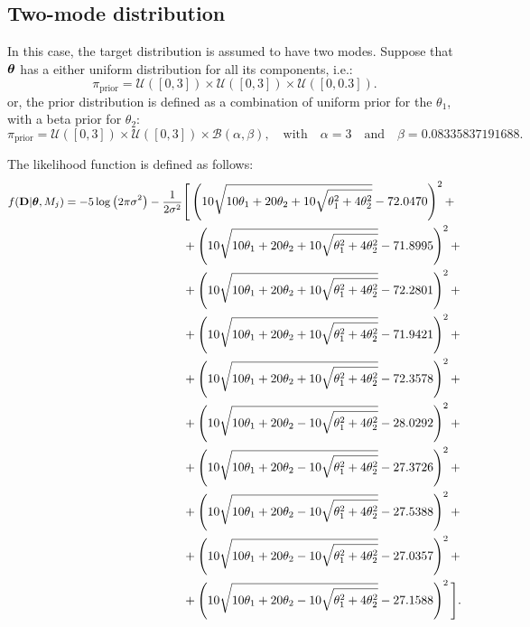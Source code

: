 \subsection{Two-mode distribution}

In this case, the target distribution is assumed to have two modes.
Suppose that $\mbox{\boldmath$ \theta $}$ has a either uniform distribution for all its components, i.e.:
$$
\pi_{\text{prior}}=\mathcal{U}([0,3]) \times \mathcal{U}([0,3]) \times \mathcal{U}([0,0.3]).
$$
or, the prior distribution is defined as a combination of uniform prior for the $\theta_1$, with a beta prior for $\theta_2$:
$$
\pi_{\text{prior}}=\mathcal{U}([0,3]) \times \mathcal{U}([0,3]) \times \mathcal{B}(\alpha,\beta), \quad \text{with} \quad \alpha=3 \quad\text{and}\quad \beta=0.08335837191688.
$$

The likelihood function is defined as follows:
\begin{equation}
\begin{split}\small
f({\bf D}|\mbox{\boldmath$ \theta $}, M_j)=  -5 \log\left(2 \pi \sigma^2\right)- \dfrac{1}{2\sigma^2} &\Bigg[ 
  \left(10 \sqrt{10 \theta_1+20 \theta_2+10 \sqrt{\theta_1^2+4 \theta_2^2}}-72.0470\right)^2+\\
&+\left(10 \sqrt{10 \theta_1+20 \theta_2+10 \sqrt{\theta_1^2+4 \theta_2^2}}-71.8995\right)^2+\\
&+\left(10 \sqrt{10 \theta_1+20 \theta_2+10 \sqrt{\theta_1^2+4 \theta_2^2}}-72.2801\right)^2+\\
&+\left(10 \sqrt{10 \theta_1+20 \theta_2+10 \sqrt{\theta_1^2+4 \theta_2^2}}-71.9421\right)^2+\\
&+\left(10 \sqrt{10 \theta_1+20 \theta_2+10 \sqrt{\theta_1^2+4 \theta_2^2}}-72.3578\right)^2+\\
&+\left(10 \sqrt{10 \theta_1+20 \theta_2-10 \sqrt{\theta_1^2+4 \theta_2^2}}-28.0292\right)^2+\\
&+\left(10 \sqrt{10 \theta_1+20 \theta_2-10 \sqrt{\theta_1^2+4 \theta_2^2}}-27.3726\right)^2+\\
&+\left(10 \sqrt{10 \theta_1+20 \theta_2-10 \sqrt{\theta_1^2+4 \theta_2^2}}-27.5388\right)^2+\\
&+\left(10 \sqrt{10 \theta_1+20 \theta_2-10 \sqrt{\theta_1^2+4 \theta_2^2}}-27.0357\right)^2+\\
&+\left(10 \sqrt{10 \theta_1+20 \theta_2-10 \sqrt{\theta_1^2+4 \theta_2^2}}-27.1588\right)^2 \Bigg].
\end{split} 
\end{equation}




